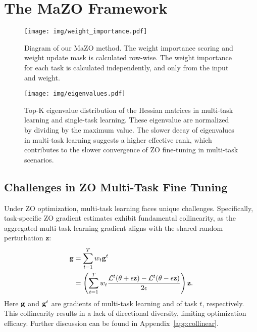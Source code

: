\section{The MaZO Framework}

\begin{figure*}[t]
    \centering
    \texttt{[image: img/weight\_importance.pdf]} 
    \caption{Diagram of our MaZO method. The weight importance scoring and weight update mask is calculated row-wise. The weight importance for each task is calculated independently, and only from the input and weight. }
    \label{fig:mask}
    \vspace{-10pt}
\end{figure*}

\begin{figure}[t]
    \centering
    \texttt{[image: img/eigenvalues.pdf]} 
    \vspace{-20pt} 
    \caption{Top-K eigenvalue distribution of the Hessian matrices in multi-task learning and single-task learning. These eigenvalue are normalized by dividing by the maximum value. The slower decay of eigenvalues in multi-task learning suggests a higher effective rank, which contributes to the slower convergence of ZO fine-tuning in multi-task scenarios.}
    \vspace{-20pt} 
    \label{fig:eigenvalue_distribution}
\end{figure}  


\subsection{Challenges in ZO Multi-Task Fine Tuning}
\label{sec:challengesmtlzo}

Under ZO optimization, multi-task learning faces unique challenges. Specifically, task-specific ZO gradient estimates exhibit fundamental collinearity, as the aggregated multi-task learning gradient aligns with the shared random perturbation $\mathbf{z}$:
\vspace{-6pt} 
\begin{align}
    \mathbf{g} &= \sum_{t=1}^T w_t \mathbf{g}^t \notag \\
    &= \left(\sum_{t=1}^T w_t \frac{\mathcal{L}^t (\theta+\epsilon \mathbf{z}) - \mathcal{L}^t(\theta-\epsilon \mathbf{z})}{2\epsilon}\right)  \mathbf{z}.
\end{align}
\vskip -8pt
\noindent Here $\mathbf{g}$ and $\mathbf{g}^t$ are gradients of multi-task learning and of task $t$, respectively.
This collinearity results in a lack of directional diversity, limiting optimization efficacy. Further discussion can be found in Appendix~\ref{app:collinear}.

